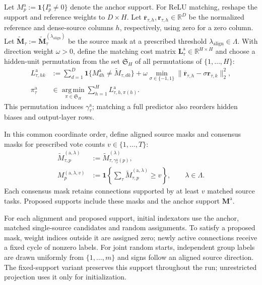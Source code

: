 Let $M_p^{\mathrm a}:=\mathbf1\{I_p^{\mathrm a}\ne0\}$ denote
the anchor support. For ReLU matching, reshape the support and
reference weights to $D\times H$. Let
$\overline{\mathbf r}_{\tau,h},\mathbf r_{\tau,h}\in\mathbb R^D$
be the normalized reference and dense-source columns $h$,
respectively, using zero for a zero column. Let
$\widetilde{\mathbf M}_\tau:=
\widetilde{\mathbf M}_\tau^{(\lambda_{\mathrm{align}})}$
be the source mask at a prescribed threshold
$\lambda_{\mathrm{align}}\in\Lambda$.
With direction weight $\omega>0$, define the matching cost matrix
$\mathbf L_\tau^{\mathrm a}\in\mathbb R^{H\times H}$ and choose a
hidden-unit permutation from the set $\mathfrak S_H$ of all
permutations of $\{1,\ldots,H\}$:
\begin{equation}
    \begin{aligned}
        L_{\tau,hk}^{\mathrm a}
        &:=\sum_{d=1}^D
            \mathbf1\{M^{\mathrm a}_{dh}\ne\widetilde M_{\tau,dk}\}
            +\omega\min_{\sigma\in\{-1,1\}}
                \|\overline{\mathbf r}_{\tau,h}
                    -\sigma\mathbf r_{\tau,k}\|_2^2,\\
        \pi_\tau^{\mathrm a}
        &\in\operatorname*{arg\,min}_{\pi\in\mathfrak S_H}
            \sum_{h=1}^H L_{\tau,h,\pi(h)}^{\mathrm a}.
    \end{aligned}
    \label{eq:method-relu-alignment}
\end{equation}
This permutation induces $\gamma_\tau^{\mathrm a}$; matching a full
predictor also reorders hidden biases and output-layer rows.

In this common coordinate order, define aligned source masks and
consensus masks for prescribed vote counts $v\in\{1,\ldots,T\}$:
\begin{equation}
    \begin{aligned}
        \widetilde M_{\tau,p}^{(\mathrm a,\lambda)}
        &:=\widetilde M_{\tau,\gamma_\tau^{\mathrm a}(p)}^{(\lambda)},\\
        M_p^{(\mathrm a,\lambda,v)}
        &:=\mathbf1\!\left\{
            \sum_\tau\widetilde M_{\tau,p}^{(\mathrm a,\lambda)}\ge v
        \right\},\qquad\lambda\in\Lambda.
    \end{aligned}
    \label{eq:method-support-proposals}
\end{equation}
Each consensus mask retains connections supported by at least $v$
matched source tasks. Proposed supports include these masks and
the anchor support $\mathbf M^{\mathrm a}$.

For each alignment and proposed support, initial indexators use the
anchor, matched single-source candidates and random assignments.
To satisfy a proposed mask, weight indices outside it are assigned zero;
newly active connections receive a fixed cycle of nonzero labels.
For joint random starts, independent group labels are drawn uniformly
from $\{1,\ldots,m\}$ and signs follow an aligned source direction.
The fixed-support variant preserves this support throughout the run;
unrestricted projection uses it only for initialization.

